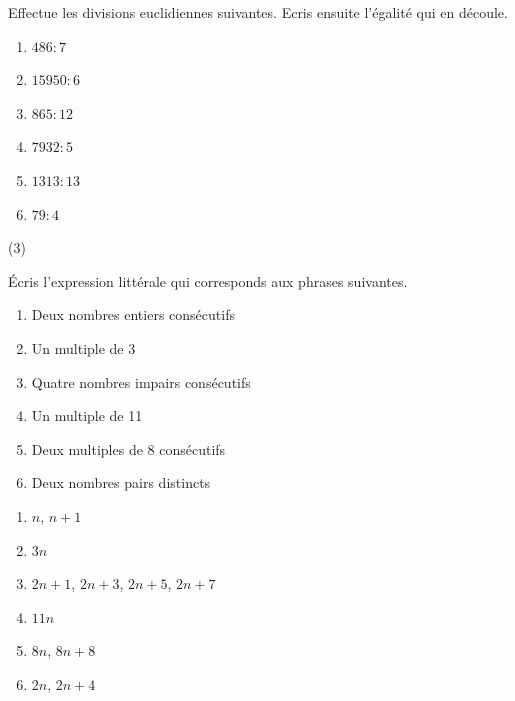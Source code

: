 \begin{exercise}
  Effectue les divisions euclidiennes suivantes. Ecris ensuite l'égalité qui en découle.
  \begin{enumerate}[cols=3]
    \item $\num{486}:7$
    \item $\num{15950}:6$
    \item $\num{865}:12$
    \item $\num{7932}:5$
    \item $\num{1313}:13$
    \item $\num{79}:4$
  \end{enumerate}
\end{exercise}
\begin{solution}
  \begin{tasks}(3)
    \task
    \bigbreak
    \task
    \bigbreak
    \task
    \bigbreak
    \task
    \bigbreak
    \task
    \bigbreak
    \task
    \bigbreak
  \end{tasks}
\end{solution}

\begin{exercise}
  Écris l'expression littérale qui corresponds aux phrases suivantes.
  \begin{enumerate}[cols=2]
    \item Deux nombres entiers consécutifs
    \item Un multiple de $3$
    \item Quatre nombres impairs consécutifs
    \item Un multiple de 11
    \item Deux multiples de 8 consécutifs
    \item Deux nombres pairs distincts
  \end{enumerate}
\end{exercise}
\begin{solution}
  \begin{enumerate}[cols=2]
    \item $n$, $n+1$
    \item $3n$
    \item $2n+1$, $2n+3$, $2n+5$, $2n+7$
    \item $11n$
    \item $8n$, $8n+8$
    \item $2n$, $2n+4$
  \end{enumerate}
\end{solution}

